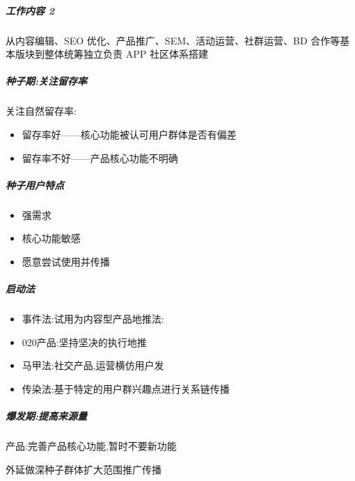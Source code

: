 \documentclass[letterpaper,11pt,english]{sphinxmanual}
\begin{document}
\subparagraph{工作内容 2\sphinxfootnotemark[395]}
\label{\detokenize{chapter_idea/GTM:id6}}%
\begin{footnotetext}[395]\sphinxAtStartFootnote
{}
%
\end{footnotetext}\ignorespaces 
从内容编辑、SEO 优化、产品推广、SEM、活动运营、社群运营、BD
合作等基本版块到整体统筹独立负责 APP 社区体系搭建


\subparagraph{种子期:关注留存率}
\label{\detokenize{chapter_idea/GTM:id7}}
关注自然留存率:
\begin{itemize}
\item {} 
留存率好——核心功能被认可用户群体是否有偏差

\item {} 
留存率不好——产品核心功能不明确

\end{itemize}


\subparagraph{种子用户特点}
\label{\detokenize{chapter_idea/GTM:id8}}\begin{itemize}
\item {} 
强需求

\item {} 
核心功能敏感

\item {} 
愿意尝试使用并传播

\end{itemize}


\subparagraph{启动法}
\label{\detokenize{chapter_idea/GTM:id9}}\begin{itemize}
\item {} 
事件法:试用为内容型产品地推法:

\item {} 
020产品:坚持坚决的执行地推

\item {} 
马甲法:社交产品,运营横仿用户发

\item {} 
传染法:基于特定的用户群兴趣点进行关系链传播

\end{itemize}


\subparagraph{爆发期:提高来源量}
\label{\detokenize{chapter_idea/GTM:id10}}
产品:完善产品核心功能,暂时不要新功能

外延做深种子群体扩大范围推广传播
\end{document}
